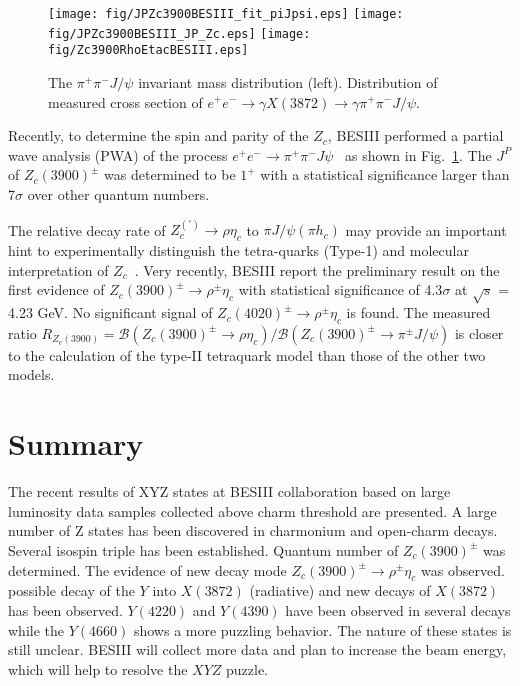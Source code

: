 \documentclass{jps-cp}
\begin{document}
\begin{figure}[tbh]
\centering
\texttt{[image: fig/JPZc3900BESIII\_fit\_piJpsi.eps]}
\texttt{[image: fig/JPZc3900BESIII\_JP\_Zc.eps]}
\texttt{[image: fig/Zc3900RhoEtacBESIII.eps]}
\caption{The $\pi^{+}\pi^{-}J/\psi$ invariant mass distribution (left). Distribution of measured cross section of $e^{+}e^{-} \rightarrow \gamma X(3872) \rightarrow \gamma \pi^{+}\pi^{-}J/\psi$.}
\label{ZcStates}
\end{figure}



Recently, to determine the spin and parity of the $Z_{c}$, BESIII performed a partial wave analysis (PWA) of the process $e^{+}e^{-}\rightarrow\pi^{+}\pi^{-} J\psi$~\cite{JPZc3900_BESIII} as shown in Fig.~\ref{ZcStates}. The $J^{P}$ of $Z_{c}(3900)^{\pm}$ was determined to be $1^{+}$ with a statistical significance larger than 7$\sigma$ over other quantum numbers.

The relative decay rate of $Z_{c}^{(')} \rightarrow \rho \eta_{c}$ to $\pi J/\psi(\pi h_{c}) $ may provide an important hint to experimentally distinguish the tetra-quarks (Type-1) and molecular interpretation of $Z_{c}$~\cite{Zc3900rhoetac}. Very recently, BESIII report the preliminary result on the first evidence of $Z_{c}(3900)^{\pm} \rightarrow \rho^{\pm} \eta_{c}$ with statistical significance of 4.3$\sigma$ at $\sqrt{s}$ = 4.23 GeV. No significant signal of $Z_{c}(4020)^{\pm} \rightarrow \rho^{\pm} \eta_{c}$ is found. The measured ratio $R_{Z_{c}(3900)} = \mathcal{B}(Z_{c}(3900)^{\pm} \rightarrow \rho \eta_{c}) / \mathcal{B}(Z_{c}(3900)^{\pm} \rightarrow \pi^{\pm} J/\psi )$ is closer to the calculation of the type-II tetraquark model than those of the other two models.

\section{Summary}
The recent results of XYZ states at BESIII collaboration based on large luminosity data samples collected above charm threshold are presented.  A large number of Z states has been discovered in charmonium and open-charm decays. Several
 isospin triple has been established.  Quantum number of $Z_{c}(3900)^{\pm}$ was determined. The evidence of new decay mode $Z_{c}(3900)^{\pm} \rightarrow \rho^{\pm} \eta_{c}$ was observed. possible decay of the $Y$ into $X(3872)$ (radiative) and new decays of $X(3872)$ has been observed. $Y(4220)$ and $Y(4390)$ have been observed in several decays while the $Y(4660)$ shows a more puzzling behavior.  The nature of these states is still unclear. BESIII will collect more data and plan to increase the beam energy, which will help to resolve the $XYZ$ puzzle.
\end{document}
